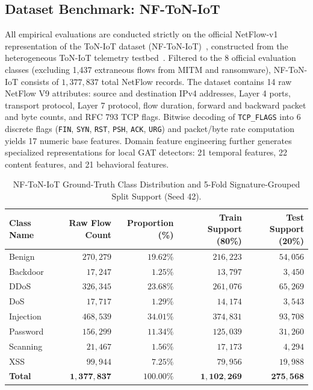 \documentclass[journal,onecolumn]{IEEEtran}
\begin{document}
\subsection{Dataset Benchmark: NF-ToN-IoT}
All empirical evaluations are conducted strictly on the official NetFlow-v1 representation of the ToN-IoT dataset (NF-ToN-IoT)~\cite{sarhan2021netflow}, constructed from the heterogeneous ToN-IoT telemetry testbed~\cite{alsaedi2020toniot}. Filtered to the 8 official evaluation classes (excluding 1,437 extraneous flows from MITM and ransomware), NF-ToN-IoT consists of $1,377,837$ total NetFlow records. The dataset contains 14 raw NetFlow V9 attributes: source and destination IPv4 addresses, Layer 4 ports, transport protocol, Layer 7 protocol, flow duration, forward and backward packet and byte counts, and RFC 793 TCP flags. Bitwise decoding of \texttt{TCP\_FLAGS} into 6 discrete flags (\texttt{FIN}, \texttt{SYN}, \texttt{RST}, \texttt{PSH}, \texttt{ACK}, \texttt{URG}) and packet/byte rate computation yields 17 numeric base features. Domain feature engineering further generates specialized representations for local GAT detectors: 21 temporal features, 22 content features, and 21 behavioral features.

\begin{table}[!t]
\centering
\caption{NF-ToN-IoT Ground-Truth Class Distribution and 5-Fold Signature-Grouped Split Support (Seed 42).}
\label{tab:dataset_distribution}
\small
\begin{tabular}{lrrrr}
\toprule
\textbf{Class Name} & \textbf{Raw Flow Count} & \textbf{Proportion (\%)} & \textbf{Train Support (80\%)} & \textbf{Test Support (20\%)} \\
\midrule
Benign & $270,279$ & $19.62\%$ & $216,223$ & $54,056$ \\
Backdoor & $17,247$ & $1.25\%$ & $13,797$ & $3,450$ \\
DDoS & $326,345$ & $23.68\%$ & $261,076$ & $65,269$ \\
DoS & $17,717$ & $1.29\%$ & $14,174$ & $3,543$ \\
Injection & $468,539$ & $34.01\%$ & $374,831$ & $93,708$ \\
Password & $156,299$ & $11.34\%$ & $125,039$ & $31,260$ \\
Scanning & $21,467$ & $1.56\%$ & $17,173$ & $4,294$ \\
XSS & $99,944$ & $7.25\%$ & $79,956$ & $19,988$ \\
\midrule
\textbf{Total} & $\mathbf{1,377,837}$ & $\mathbf{100.00\%}$ & $\mathbf{1,102,269}$ & $\mathbf{275,568}$ \\
\bottomrule
\end{tabular}
\end{table}
\end{document}
